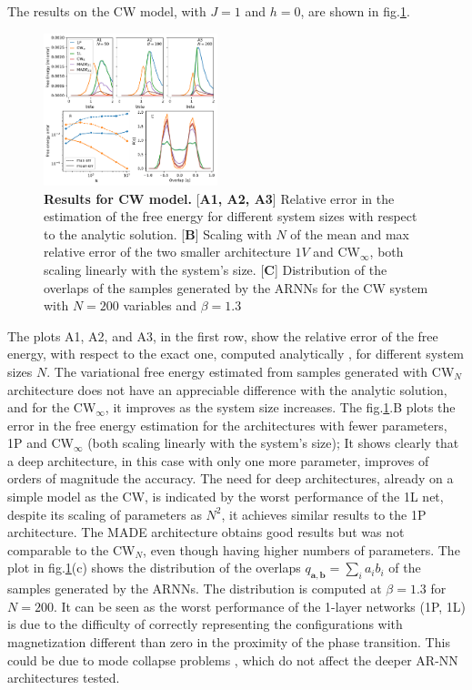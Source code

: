 \documentclass[aps,physrev,10pt,floatfix,reprint]{revtex4-2}
\begin{document}
The results on the CW model, with $J=1$ and $h=0$, are shown in fig.\ref{fig:curie_weiss}. 
\begin{figure}[h]
    \centering
    \includegraphics[width=0.45\textwidth]{img/CW_res.pdf}
    \caption{\textbf{Results for CW model.} [\textbf{A1, A2, A3}] Relative error in the estimation of the free energy for different system sizes with respect to the analytic solution. [\textbf{B}] Scaling with $N$ of the mean and max relative error of the two smaller architecture $1V$ and CW$_{\infty}$, both scaling linearly with the system's size. [\textbf{C}] Distribution of the overlaps of the samples generated by the ARNNs for the CW system with $N=200$ variables and $\beta=1.3$}
    \label{fig:curie_weiss}
\end{figure} 

The plots A1, A2, and A3, in the first row, show the relative error of the free energy, with respect to the exact one, computed analytically \cite{kadanoff2000statistical}, for different system sizes $N$.  
The variational free energy estimated from samples generated with CW$_N$ architecture does not have an appreciable difference with the analytic solution, and for the CW$_{\infty}$, it improves as the system size increases. The fig.\ref{fig:curie_weiss}.B plots the error in the free energy estimation for the architectures with fewer parameters, 1P and CW$_{\infty}$ (both scaling linearly with the system's size); It shows clearly that a deep architecture, in this case with only one more parameter, improves of orders of magnitude the accuracy. The need for deep architectures, already on a simple model as the CW, is indicated by the worst performance of the 1L net, despite its scaling of parameters as $N^2$, it achieves similar results to the 1P architecture. The MADE architecture obtains good results but was not comparable to the CW$_N$, even though having higher numbers of parameters. The plot in fig.\ref{fig:curie_weiss}(c) shows the distribution of the overlaps $q_{\mathbf{a}, \mathbf{b}}=\sum_{i} a_i b_i$ of the samples generated by the ARNNs. The distribution is computed at $\beta=1.3$ for $N=200$. It can be seen as the worst performance of the 1-layer networks (1P, 1L) is due to the difficulty of correctly representing the configurations with magnetization different than zero in the proximity of the phase transition. This could be due to mode collapse problems \cite{https://doi.org/10.48550/arxiv.2210.11145}, which do not affect the deeper AR-NN architectures tested.\\
\end{document}
